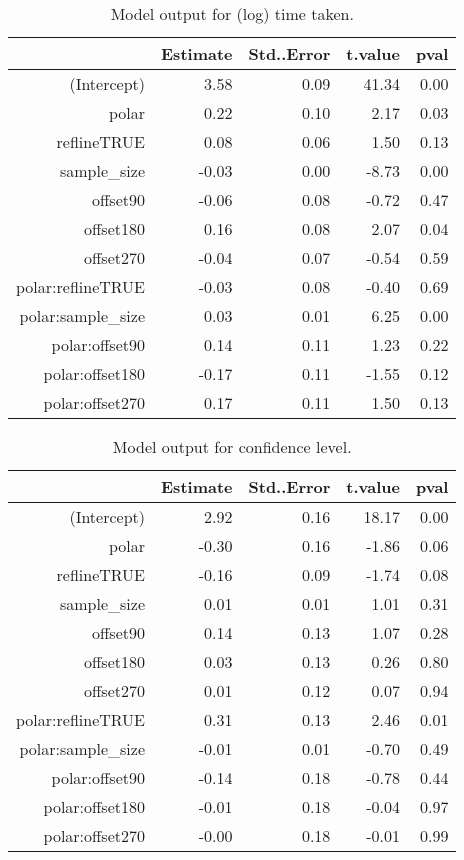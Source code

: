 \begin{table}[ht]
\begin{center}
\resizebox{\linewidth}{!} {
\begin{tabular}{rrrrr}
  \hline
 & Estimate & Std..Error & t.value & pval \\ 
  \hline
(Intercept) & 3.58 & 0.09 & 41.34 & 0.00 \\ 
  polar & 0.22 & 0.10 & 2.17 & 0.03 \\ 
  reflineTRUE & 0.08 & 0.06 & 1.50 & 0.13 \\ 
  sample\_size & -0.03 & 0.00 & -8.73 & 0.00 \\ 
  offset90 & -0.06 & 0.08 & -0.72 & 0.47 \\ 
  offset180 & 0.16 & 0.08 & 2.07 & 0.04 \\ 
  offset270 & -0.04 & 0.07 & -0.54 & 0.59 \\ 
  polar:reflineTRUE & -0.03 & 0.08 & -0.40 & 0.69 \\ 
  polar:sample\_size & 0.03 & 0.01 & 6.25 & 0.00 \\ 
  polar:offset90 & 0.14 & 0.11 & 1.23 & 0.22 \\ 
  polar:offset180 & -0.17 & 0.11 & -1.55 & 0.12 \\ 
  polar:offset270 & 0.17 & 0.11 & 1.50 & 0.13 \\ 
   \hline
\end{tabular}}
\end{center}
\caption{\label{tbl:time} Model output for (log) time taken. }
\end{table}



\begin{table}[ht]
\begin{center}
\begin{tabular}{rrrrr}
  \hline
 & Estimate & Std..Error & t.value & pval \\ 
  \hline
(Intercept) & 2.92 & 0.16 & 18.17 & 0.00 \\ 
  polar & -0.30 & 0.16 & -1.86 & 0.06 \\ 
  reflineTRUE & -0.16 & 0.09 & -1.74 & 0.08 \\ 
  sample\_size & 0.01 & 0.01 & 1.01 & 0.31 \\ 
  offset90 & 0.14 & 0.13 & 1.07 & 0.28 \\ 
  offset180 & 0.03 & 0.13 & 0.26 & 0.80 \\ 
  offset270 & 0.01 & 0.12 & 0.07 & 0.94 \\ 
  polar:reflineTRUE & 0.31 & 0.13 & 2.46 & 0.01 \\ 
  polar:sample\_size & -0.01 & 0.01 & -0.70 & 0.49 \\ 
  polar:offset90 & -0.14 & 0.18 & -0.78 & 0.44 \\ 
  polar:offset180 & -0.01 & 0.18 & -0.04 & 0.97 \\ 
  polar:offset270 & -0.00 & 0.18 & -0.01 & 0.99 \\ 
   \hline
\end{tabular}
\end{center}
\caption{\label{tbl:confidence} Model output for confidence level. }
\end{table}


